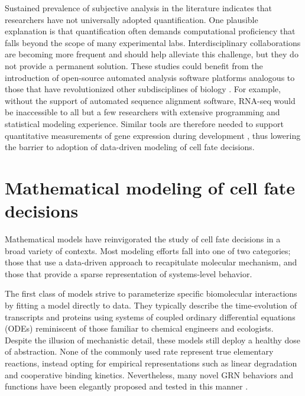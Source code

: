 Sustained prevalence of subjective analysis in the literature indicates that researchers have not universally adopted quantification. One plausible explanation is that quantification often demands computational proficiency that falls beyond the scope of many experimental labs. Interdisciplinary collaborations are becoming more frequent and should help alleviate this challenge, but they do not provide a permanent solution. These studies could benefit from the introduction of open-source automated analysis software platforms analogous to those that have revolutionized other subdisciplines of biology \cite{Aghaeepour2013,Chen2015,Pyne2009,Bernstein2008,Hellemans2007,Langmead2012,Trapnell2009,Costes2004,Kelley2015,Carpenter2006,Paintdakhi2016,Schindelin2012,Sommer2011}. For example, without the support of automated sequence alignment software, RNA-seq would be inaccessible to all but a few researchers with extensive programming and statistical modeling experience. Similar tools are therefore needed to support quantitative measurements of gene expression during development \cite{Jug2014,Sbalzarini2016,Schindelin2015}, thus lowering the barrier to adoption of data-driven modeling of cell fate decisions.

\section{Mathematical modeling of cell fate decisions}

Mathematical models have reinvigorated the study of cell fate decisions in a broad variety of contexts. Most modeling efforts fall into one of two categories; those that use a data-driven approach to recapitulate molecular mechanism, and those that provide a sparse representation of systems-level behavior. 

The first class of models strive to parameterize specific biomolecular interactions by fitting a model directly to data. They typically describe the time-evolution of transcripts and proteins using systems of coupled ordinary differential equations (ODEs) reminiscent of those familiar to chemical engineers and ecologists. Despite the illusion of mechanistic detail, these models still deploy a healthy dose of abstraction. None of the commonly used rate represent true elementary reactions, instead opting for empirical representations such as linear degradation and cooperative binding kinetics. Nevertheless, many novel GRN behaviors and functions have been elegantly proposed and tested in this manner \cite{Barkai1997b,Yu2008a,Paulsen2011}. 

